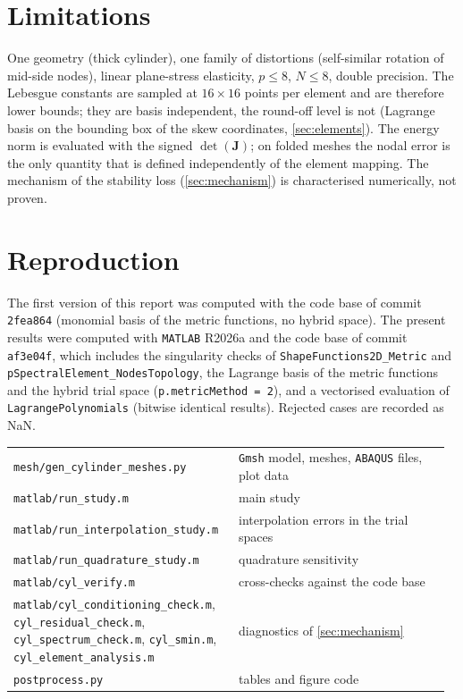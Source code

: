 \section{Limitations}\label{sec:limitations}
One geometry (thick cylinder), one family of distortions (self-similar rotation of
mid-side nodes), linear plane-stress elasticity, $p\le8$, $N\le8$, double precision. The
Lebesgue constants are sampled at $16\times16$ points per element and are therefore lower
bounds; they are basis independent, the round-off level is not (Lagrange basis on the
bounding box of the skew coordinates, \cref{sec:elements}). The energy norm is evaluated with
the signed $\det(\bm J)$; on folded meshes the nodal error is the only quantity that is defined
independently of the element mapping. The mechanism of the stability loss
(\cref{sec:mechanism}) is characterised numerically, not proven.

\section{Reproduction}\label{sec:reproduce}
The first version of this report was computed with the code base of commit \texttt{2fea864}
(monomial basis of the metric functions, no hybrid space). The present results were computed
with \texttt{MATLAB} R2026a and the code base of commit \texttt{af3e04f}, which includes the singularity checks of
\texttt{ShapeFunctions2D\_Metric} and \texttt{pSpectralElement\_NodesTopology}, the Lagrange
basis of the metric functions and the hybrid trial space (\texttt{p.metricMethod = 2}), and a
vectorised evaluation of \texttt{LagrangePolynomials} (bitwise identical results). Rejected
cases are recorded as NaN.

{\small
\begin{tabular}{@{}p{0.5\linewidth}p{0.47\linewidth}@{}}
\texttt{mesh/gen\_cylinder\_meshes.py} & \texttt{Gmsh} model, meshes, \texttt{ABAQUS} files, plot data\\
\texttt{matlab/run\_study.m} & main study\\
\texttt{matlab/run\_interpolation\_study.m} & interpolation errors in the trial spaces\\
\texttt{matlab/run\_quadrature\_study.m} & quadrature sensitivity\\
\texttt{matlab/cyl\_verify.m} & cross-checks against the code base\\
\texttt{matlab/cyl\_conditioning\_check.m}, \texttt{cyl\_residual\_check.m}, \texttt{cyl\_spectrum\_check.m}, \texttt{cyl\_smin.m}, \texttt{cyl\_element\_analysis.m} & diagnostics of \cref{sec:mechanism}\\
\texttt{postprocess.py} & tables and figure code\\
\end{tabular}}
